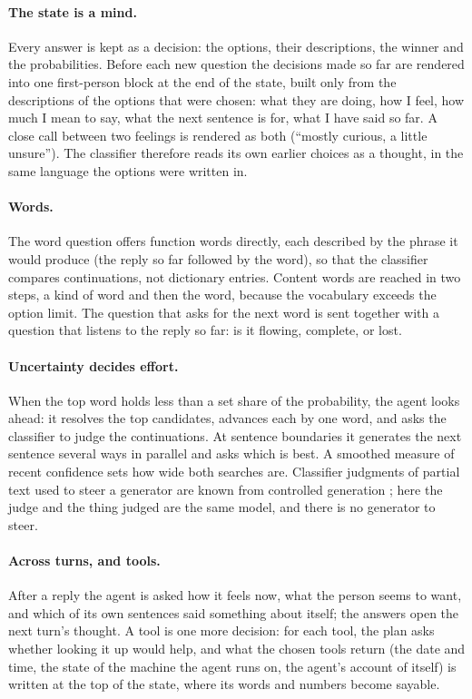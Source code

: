 \documentclass[10pt,twocolumn]{article}
\begin{document}
\paragraph{The state is a mind.} Every answer is kept as a decision: the options, their
descriptions, the winner and the probabilities. Before each new question the decisions made so far
are rendered into one first-person block at the end of the state, built only from the descriptions
of the options that were chosen: what they are doing, how I feel, how much I mean to say, what the
next sentence is for, what I have said so far. A close call between two feelings is rendered as
both (``mostly curious, a little unsure''). The classifier therefore reads its own earlier choices
as a thought, in the same language the options were written in.

\paragraph{Words.} The word question offers function words directly, each described by the phrase
it would produce (the reply so far followed by the word), so that the classifier compares
continuations, not dictionary entries. Content words are reached in two steps, a kind of word and
then the word, because the vocabulary exceeds the option limit. The question that asks for the next
word is sent together with a question that listens to the reply so far: is it flowing, complete, or
lost.

\paragraph{Uncertainty decides effort.} When the top word holds less than a set share of the
probability, the agent looks ahead: it resolves the top candidates, advances each by one word, and
asks the classifier to judge the continuations. At sentence boundaries it generates the next
sentence several ways in parallel and asks which is best. A smoothed measure of recent confidence
sets how wide both searches are. Classifier judgments of partial text used to steer a generator are
known from controlled generation \citep{dathathri2020pplm,krause2021gedi,yang2021fudge}; here the
judge and the thing judged are the same model, and there is no generator to steer.

\paragraph{Across turns, and tools.} After a reply the agent is asked how it feels now, what the
person seems to want, and which of its own sentences said something about itself; the answers open
the next turn's thought. A tool is one more decision: for each tool, the plan asks whether looking
it up would help, and what the chosen tools return (the date and time, the state of the machine the
agent runs on, the agent's account of itself) is written at the top of the state, where its words
and numbers become sayable.
\end{document}
